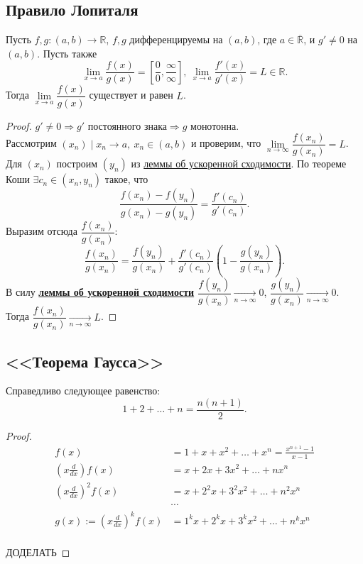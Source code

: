 \subsection{Правило Лопиталя}

\begin{theorem} \hypertarget{t3}{}
	Пусть $f, g \colon (a, b) \to \mathbb{R}$, $f, g$ дифференцируемы на $(a, b)$, где $a \in \overline{\mathbb{R}}$, и $g' \neq 0$ на $(a, b)$.
	Пусть также \[
		\lim_{x \to a} \frac{f(x)}{g(x)} = \left[ \frac00, \frac{\infty}{\infty} \right],
		~\lim_{x \to a} \frac{f'(x)}{g'(x)} = L \in \mathbb{R}.
	\]
	Тогда $\lim\limits_{x \to a} \dfrac{f(x)}{g(x)}$ существует и равен $L$.
\end{theorem}
\begin{proof}
	$g' \neq 0 \Rightarrow g' \text{ постоянного знака} \Rightarrow g \text{ монотонна}$. \\
	Рассмотрим $(x_n) \mid x_n \to a, ~x_n \in (a, b)$ и проверим, что $\lim\limits_{n \to \infty} \dfrac{f(x_n)}{g(x_n)} = L$.
	Для $(x_n)$ построим $(y_n)$ из \hyperlink{t2}{леммы об ускоренной сходимости}. По теореме Коши
	$\exists c_n \in (x_n, y_n)$ такое, что \[
		\frac{f(x_n) - f(y_n)}{g(x_n) - g(y_n)} = \frac{f'(c_n)}{g'(c_n)}.
	\]
	Выразим отсюда $\dfrac{f(x_n)}{g(x_n)}$: \[
		\frac{f(x_n)}{g(x_n)} = \frac{f(y_n)}{g(x_n)} + \frac{f'(c_n)}{g'(c_n)} \left( 1 - \frac{g(y_n)}{g(x_n)} \right).
	\]
	В силу \hyperlink{t2}{\bfseries леммы об ускоренной сходимости}
	\hbox{$\dfrac{f(y_n)}{g(x_n)} \xrightarrow[n \to \infty]{} 0$}, \hbox{$\dfrac{g(y_n)}{g(x_n)} \xrightarrow[n \to \infty]{} 0$}.
	Тогда $\dfrac{f(x_n)}{g(x_n)} \xrightarrow[n \to \infty]{} L$.
\end{proof}

\subsection{<<Теорема Гаусса>>}

\begin{theorem} \hypertarget{t4}{}
	Справедливо следующее равенство: \[
		1 + 2 + \ldots + n = \frac{n (n + 1)}{2}.
	\]
\end{theorem}
\begin{proof}
	\begin{align*}
									    		f(x) &= 1 + x + x^2 + \ldots + x^n = \frac{x^{n + 1} - 1}{x - 1}		\\
		 		  \left( x \frac{d}{dx} \right) f(x) &= x + 2 x + 3 x^2 + \ldots + n x^n								\\
				\left( x \frac{d}{dx} \right)^2 f(x) &= x + 2^2 x + 3^2 x^2 + \ldots + n^2 x^n							\\
													 &\cdots															\\
		g(x) := \left( x \frac{d}{dx} \right)^k f(x) &= 1^k x + 2^k x + 3^k x^2 + \ldots + n^k x^n						\\
	\end{align*}
	
	ДОДЕЛАТЬ
\end{proof}

